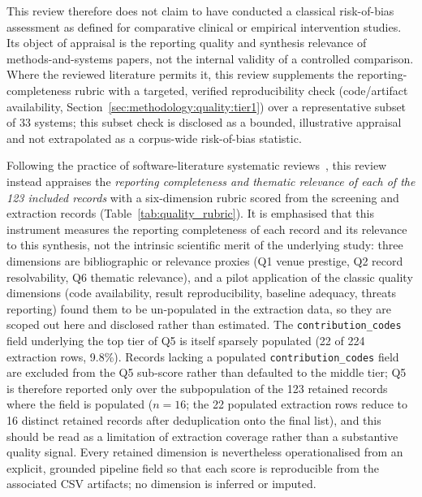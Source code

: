 This review therefore does not claim to have conducted a classical risk-of-bias
assessment as defined for comparative clinical or empirical intervention studies.
Its object of appraisal is the reporting quality and synthesis relevance of
methods-and-systems papers, not the internal validity of a controlled comparison.
Where the reviewed literature permits it, this review supplements the
reporting-completeness rubric with a targeted, verified reproducibility check
(code/artifact availability, Section~\ref{sec:methodology:quality:tier1}) over a
representative subset of 33 systems; this subset check is disclosed as a bounded,
illustrative appraisal and not extrapolated as a corpus-wide risk-of-bias
statistic.

Following the practice of software-literature systematic
reviews~\cite{XiaoWatson2019}, this review instead appraises the \emph{reporting
completeness and thematic relevance of each of the 123 included records} with a
six-dimension rubric scored
from the screening and extraction records (Table~\ref{tab:quality_rubric}). It is
emphasised that this instrument measures the reporting completeness of each record
and its relevance to this synthesis, not the intrinsic scientific merit of the
underlying study: three dimensions are bibliographic or relevance proxies (Q1
venue prestige, Q2 record resolvability, Q6 thematic relevance), and a pilot
application of the classic quality dimensions (code availability, result
reproducibility, baseline adequacy, threats reporting) found them to be
un-populated in the extraction data, so they are scoped out here and disclosed
rather than estimated. The \texttt{contribution\_codes} field underlying the top
tier of Q5 is itself sparsely populated (22 of 224 extraction rows, 9.8\%). Records
lacking a populated \texttt{contribution\_codes} field are excluded from the Q5
sub-score rather than defaulted to the middle tier; Q5 is therefore reported only
over the subpopulation of the 123 retained records where the field is populated
($n=16$; the 22 populated extraction rows reduce to 16 distinct retained records
after deduplication onto the final list), and this should be read as a limitation
of extraction coverage rather than a substantive quality signal. Every retained
dimension is nevertheless operationalised from an explicit, grounded pipeline field
so that each score is reproducible from the associated CSV artifacts; no dimension
is inferred or imputed.

